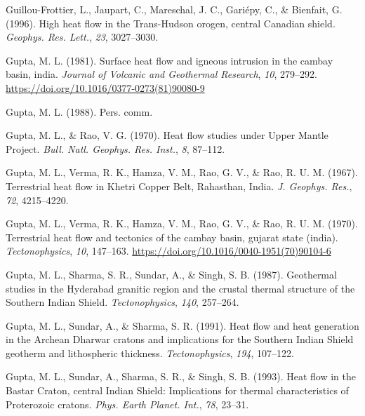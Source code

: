 \documentclass[draft,linenumbers]{agujournal2018}
\begin{document}
\leavevmode{}%
Guillou-Frottier, L., Jaupart, C., Mareschal, J. C., Gariépy, C., \&
Bienfait, G. (1996). High heat flow in the {Trans-Hudson} orogen,
central {Canadian} shield. \emph{Geophys. Res. Lett.}, \emph{23},
3027--3030.

\leavevmode{}%
Gupta, M. L. (1981). Surface heat flow and igneous intrusion in the
cambay basin, india. \emph{Journal of Volcanic and Geothermal Research},
\emph{10}, 279--292. \url{https://doi.org/10.1016/0377-0273(81)90080-9}

\leavevmode{}%
Gupta, M. L. (1988). Pers. comm.

\leavevmode{}%
Gupta, M. L., \& Rao, V. G. (1970). Heat flow studies under {Upper
Mantle Project}. \emph{Bull. Natl. Geophys. Res. Inst.}, \emph{8},
87--112.

\leavevmode{}%
Gupta, M. L., Verma, R. K., Hamza, V. M., Rao, G. V., \& Rao, R. U. M.
(1967). Terrestrial heat flow in {Khetri Copper Belt}, {Rahasthan,
India}. \emph{J. Geophys. Res.}, \emph{72}, 4215--4220.

\leavevmode{}%
Gupta, M. L., Verma, R. K., Hamza, V. M., Rao, G. V., \& Rao, R. U. M.
(1970). Terrestrial heat flow and tectonics of the cambay basin, gujarat
state (india). \emph{Tectonophysics}, \emph{10}, 147--163.
\url{https://doi.org/10.1016/0040-1951(70)90104-6}

\leavevmode{}%
Gupta, M. L., Sharma, S. R., Sundar, A., \& Singh, S. B. (1987).
Geothermal studies in the {Hyderabad} granitic region and the crustal
thermal structure of the {Southern Indian Shield}.
\emph{Tectonophysics}, \emph{140}, 257--264.

\leavevmode{}%
Gupta, M. L., Sundar, A., \& Sharma, S. R. (1991). Heat flow and heat
generation in the {Archean Dharwar} cratons and implications for the
{Southern Indian Shield} geotherm and lithospheric thickness.
\emph{Tectonophysics}, \emph{194}, 107--122.

\leavevmode{}%
Gupta, M. L., Sundar, A., Sharma, S. R., \& Singh, S. B. (1993). Heat
flow in the {Bastar Craton}, central {Indian Shield}: Implications for
thermal characteristics of {Proterozoic} cratons. \emph{Phys. Earth
Planet. Int.}, \emph{78}, 23--31.
\end{document}
